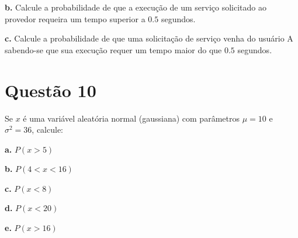 \documentclass[a5paper]{report}
\begin{document}
\textbf{b.} Calcule a probabilidade de que a execução de um serviço solicitado ao provedor requeira um tempo superior a $0.5$ segundos.


\textbf{c.} Calcule a probabilidade de que uma solicitação de serviço venha do usuário A sabendo-se que sua execução requer um tempo maior do que $0.5$ segundos.


\section*{Questão 10}
Se $x$ é uma variável aleatória normal (gaussiana) com parâmetros $\mu = 10$ e $\sigma^2 = 36$, calcule:

\textbf{a.} $P(x > 5)$

\textbf{b.} $P(4 < x< 16)$

\textbf{c.} $P(x < 8)$

\textbf{d.} $P(x < 20)$

\textbf{e.} $P(x > 16)$
	
\end{document}
